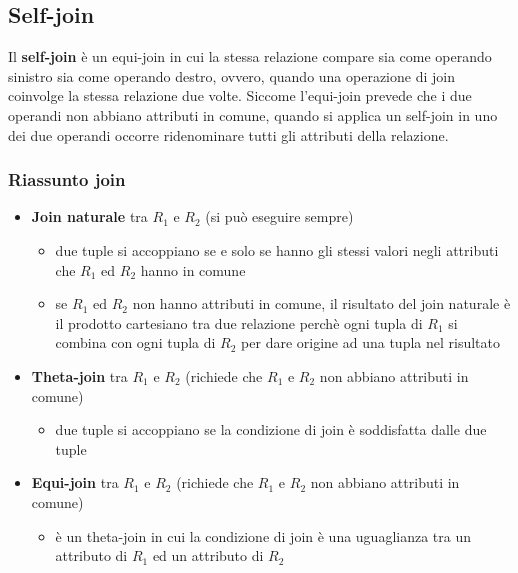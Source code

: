\subsection{Self-join}
Il \textbf{self-join} è un equi-join in cui la stessa relazione compare sia come operando sinistro sia come operando destro, ovvero, quando una operazione di join coinvolge la stessa relazione due volte. 
Siccome l'equi-join prevede che i due operandi non abbiano attributi in comune, quando si applica un self-join in uno dei due operandi occorre ridenominare tutti gli attributi della relazione.
\newpage \subsubsection{Riassunto join}
\begin{itemize}
    \item \textbf{Join naturale} tra $R_1 \text{ e } R_2$ (si può eseguire sempre)
    \begin{itemize}
        \item due tuple si accoppiano se e solo se hanno gli stessi valori negli attributi che $R_1$ ed $R_2$ hanno in comune
        \item se $R_1 \text{ ed }R_2$ non hanno attributi in comune, il risultato del join naturale è il prodotto cartesiano tra due relazione perchè ogni tupla di $R_1$ si combina con ogni tupla di $R_2$ per dare origine ad una tupla nel risultato
    \end{itemize}
    \item \textbf{Theta-join} tra $R_1$ e $R_2$ (richiede che $R_1$ e $R_2$ non abbiano attributi in comune)
    \begin{itemize}
        \item due tuple si accoppiano se la condizione di join è soddisfatta dalle due tuple
    \end{itemize}
    \item \textbf{Equi-join} tra $R_1$ e $R_2$ (richiede che $R_1$ e $R_2$ non abbiano attributi in comune)
    \begin{itemize}
        \item è un theta-join in cui la condizione di join è una uguaglianza tra un attributo di $R_1$ ed un attributo di $R_2$
    \end{itemize}
\end{itemize}

